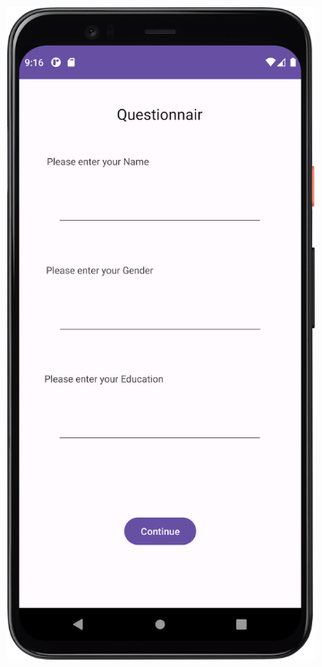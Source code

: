 \begin{figure}[htbp]
\vspace{1cm}
    \begin{subfigure}[b]{0.25\textwidth}
        \centering
        \includegraphics[width=\textwidth]{content/06_demonstration_of_the_artifact/Screenshot_QuestionnairScreen.png}

\end{subfigure}
\end{figure}
